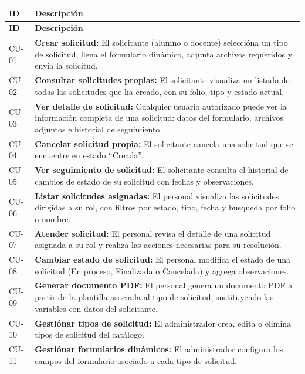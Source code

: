 \begin{longtable}{|C{1.2cm}|L{12.5cm}|}
    \hline
    \textbf{ID} & \textbf{Descripción} \\
    \hline
    \endfirsthead
    \hline
    \textbf{ID} & \textbf{Descripción} \\
    \hline
    \endhead
    \hline
    \endfoot

    CU-01 & \textbf{Crear solicitud:} El solicitante (alumno o docente) seleccióna un tipo de solicitud, llena el formulario dinámico, adjunta archivos requeridos y envia la solicitud. \\
    \hline
    CU-02 & \textbf{Consultar solicitudes propias:} El solicitante visualiza un listado de todas las solicitudes que ha creado, con su folio, tipo y estado actual. \\
    \hline
    CU-03 & \textbf{Ver detalle de solicitud:} Cualquier usuario autorizado puede ver la información completa de una solicitud: datos del formulario, archivos adjuntos e historial de seguimiento. \\
    \hline
    CU-04 & \textbf{Cancelar solicitud propia:} El solicitante cancela una solicitud que se encuentre en estado ``Creada''. \\
    \hline
    CU-05 & \textbf{Ver seguimiento de solicitud:} El solicitante consulta el historial de cambios de estado de su solicitud con fechas y observaciones. \\
    \hline
    CU-06 & \textbf{Listar solicitudes asignadas:} El personal visualiza las solicitudes dirigidas a su rol, con filtros por estado, tipo, fecha y busqueda por folio o nombre. \\
    \hline
    CU-07 & \textbf{Atender solicitud:} El personal revisa el detalle de una solicitud asignada a su rol y realiza las acciones necesarias para su resolución. \\
    \hline
    CU-08 & \textbf{Cambiar estado de solicitud:} El personal modifica el estado de una solicitud (En proceso, Finalizada o Cancelada) y agrega observaciones. \\
    \hline
    CU-09 & \textbf{Generar documento PDF:} El personal genera un documento PDF a partir de la plantilla asociada al tipo de solicitud, sustituyendo las variables con datos del solicitante. \\
    \hline
    CU-10 & \textbf{Gestiónar tipos de solicitud:} El administrador crea, edita o elimina tipos de solicitud del catálogo. \\
    \hline
    CU-11 & \textbf{Gestiónar formularios dinámicos:} El administrador configura los campos del formulario asociado a cada tipo de solicitud. \\

\end{longtable}
